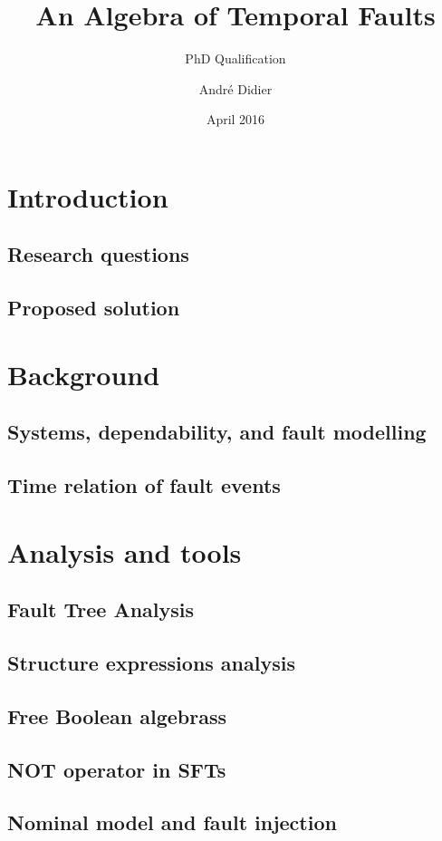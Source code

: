 \documentclass{beamer}
\title{An Algebra of Temporal Faults}
\subtitle{PhD Qualification}
\date{April 2016}
\author{André Didier}
\institute{
\inst{1}Federal University of Pernambuco\\
Centre of Informatics
}
\begin{document}
\begin{frame}[label=title]
\titlepage
\end{frame}

\section{Introduction}
\subsection{Research questions}
\subsection{Proposed solution}

\section{Background}
\subsection{Systems, dependability, and fault modelling}
\subsection{Time relation of fault events}

\section{Analysis and tools}
\subsection{Fault Tree Analysis}
\subsection{Structure expressions analysis}
\subsection{Free Boolean algebrass}
\subsection{NOT operator in SFTs}
\subsection{Nominal model and fault injection}
\end{document}
